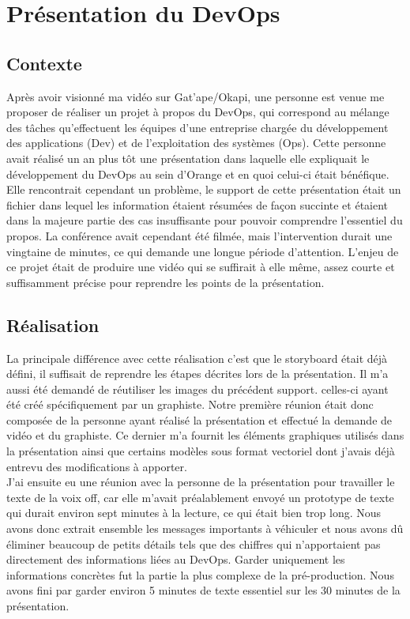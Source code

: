 \section{Présentation du DevOps}


\subsection{Contexte}

Après avoir visionné ma vidéo sur Gat'ape/Okapi, une personne est venue me proposer de réaliser un projet à propos du DevOps, qui correspond au mélange des tâches qu'effectuent les équipes d'une entreprise chargée du développement des applications (Dev) et de l'exploitation des systèmes (Ops). Cette personne avait réalisé un an plus tôt une présentation dans laquelle elle expliquait le développement du DevOps au sein d'Orange et en quoi celui-ci était bénéfique. Elle rencontrait cependant un problème, le support de cette présentation était un fichier dans lequel les information étaient résumées de façon succinte et étaient dans la majeure partie des cas insuffisante pour pouvoir comprendre l'essentiel du propos. La conférence avait cependant été filmée, mais l'intervention durait une vingtaine de minutes, ce qui demande une longue période d'attention. L'enjeu de ce projet était de produire une vidéo qui se suffirait à elle même, assez courte et suffisamment précise pour reprendre les points de la présentation.


\subsection{Réalisation}
La principale différence avec cette réalisation c'est que le storyboard était déjà défini, il suffisait de reprendre les étapes décrites lors de la présentation. Il m'a aussi été demandé de réutiliser les images du précédent support. celles-ci ayant été créé spécifiquement par un graphiste. Notre première réunion était donc composée de la personne ayant réalisé la présentation et effectué la demande de vidéo et du graphiste. Ce dernier m'a fournit les éléments graphiques utilisés dans la présentation ainsi que certains modèles sous format vectoriel dont j'avais déjà entrevu des modifications à apporter.\\

J'ai ensuite eu une réunion avec la personne de la présentation pour travailler le texte de la voix off, car elle m'avait préalablement envoyé un prototype de texte qui durait environ sept minutes à la lecture, ce qui était bien trop long. Nous avons donc extrait ensemble les messages importants à véhiculer et nous avons dû éliminer beaucoup de petits détails tels que des chiffres qui n'apportaient pas directement des informations liées au DevOps. Garder uniquement les informations concrètes fut la partie la plus complexe de la pré-production. Nous avons fini par garder environ 5 minutes de texte essentiel sur les 30 minutes de la présentation.\\

